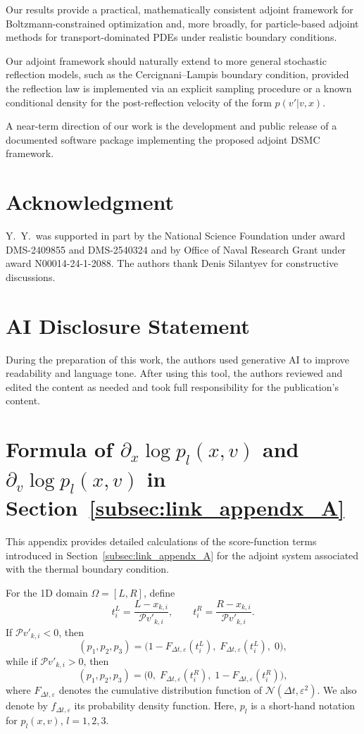 \documentclass[12pt,nopreprintline]{elsarticle}
\begin{document}
Our results provide a practical, mathematically consistent adjoint framework for Boltzmann-constrained optimization and, more broadly, for particle-based adjoint methods for transport-dominated PDEs under realistic boundary conditions.

Our adjoint framework should  naturally extend to more general stochastic reflection models, such as the Cercignani--Lampis boundary condition, provided the reflection law is implemented via an explicit sampling procedure or a known conditional density for the post-reflection velocity of the form $p(v'|v,x)$.

{A near-term direction of our work is the development and public release of a documented software package implementing the proposed adjoint DSMC framework.}

\section*{Acknowledgment}
Y.~Y.~was supported in part by the National Science Foundation under award DMS-2409855 and DMS-2540324 and by Office of Naval Research Grant under award N00014-24-1-2088. The authors thank Denis Silantyev for constructive discussions.

\section*{AI Disclosure Statement}
During the preparation of this work, the authors used generative AI to improve readability and language tone. After using this tool, the authors reviewed and edited the content as needed and took full responsibility for the publication's content.




\appendix
\section{Formula of $\partial_x \log p_l(x,v)$ and  $\partial_v \log p_l(x,v)$ in Section~\ref{subsec:link_appendx_A}}\label{app:log}
This appendix provides detailed calculations of the score-function terms introduced in Section~\ref{subsec:link_appendx_A} for the adjoint system associated with the thermal boundary condition.

For the 1D domain $\Omega=[L,R]$, define
\[
t_i^L = \frac{L-x_{k,i}}{\mathcal P v'_{k,i}},
\qquad
t_i^R = \frac{R-x_{k,i}}{\mathcal P v'_{k,i}} .
\]
If $\mathcal P v'_{k,i}<0$, then
\[
(p_1,p_2,p_3) =
\bigl(1-F_{\Delta t,\varepsilon}(t_i^L),\;
F_{\Delta t,\varepsilon}(t_i^L),\; 0\bigr),
\]
while if $\mathcal P v'_{k,i}>0$, then
\[
(p_1,p_2,p_3) =
\bigl(0,\;
F_{\Delta t,\varepsilon}(t_i^R),\; 1-F_{\Delta t,\varepsilon}(t_i^R)\bigr),
\]
where $F_{\Delta t,\varepsilon}$ denotes the cumulative distribution function of $\mathcal N(\Delta t,\varepsilon^2)$. We also denote by $f_{\Delta t,\varepsilon}$ its probability density function. Here, $p_l$ is a short-hand notation for $p_l(x,v)$, $l= 1,2,3$.
\end{document}

